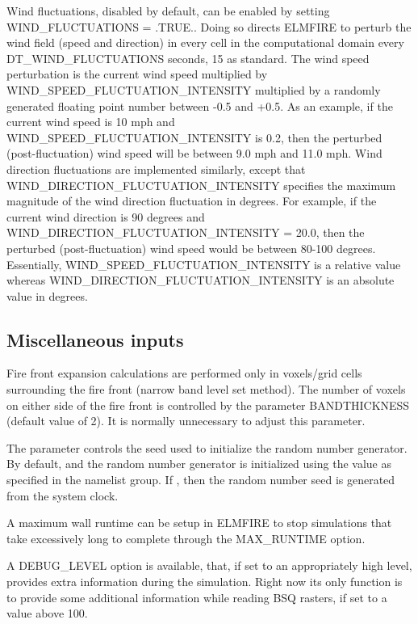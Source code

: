 Wind fluctuations, disabled by default, can be enabled by setting WIND\_FLUCTUATIONS = .TRUE.. Doing so directs ELMFIRE to perturb the wind field (speed and direction) in every cell in the computational domain every DT\_WIND\_FLUCTUATIONS seconds, 15 as standard. The wind speed perturbation is the current wind speed multiplied by WIND\_SPEED\_FLUCTUATION\_INTENSITY multiplied by a randomly generated floating point number between -0.5 and +0.5. As an example, if the current wind speed is 10 mph and WIND\_SPEED\_FLUCTUATION\_INTENSITY is 0.2, then the perturbed (post-fluctuation) wind speed will be between 9.0 mph and 11.0 mph. Wind direction fluctuations are implemented similarly, except that WIND\_DIRECTION\_FLUCTUATION\_INTENSITY specifies the maximum magnitude of the wind direction fluctuation in degrees. For example, if the current wind direction is 90 degrees and WIND\_DIRECTION\_FLUCTUATION\_INTENSITY = 20.0, then the perturbed (post-fluctuation) wind speed would be between 80-100 degrees. Essentially, WIND\_SPEED\_FLUCTUATION\_INTENSITY is a relative value whereas WIND\_DIRECTION\_FLUCTUATION\_INTENSITY is an absolute value in degrees.

\subsection{Miscellaneous inputs}
\label{miscellaneous_inputs}

Fire front expansion calculations are performed only in voxels/grid cells surrounding the fire front (narrow band level set method). The number of voxels on either side of the fire front is controlled by the parameter BANDTHICKNESS (default value of 2). It is normally unnecessary to adjust this parameter.

The parameter  controls the seed used to initialize the random number generator. By default,  and the random number generator is initialized using the  value as specified in the  namelist group. If , then the random number seed is generated from the system clock.

A maximum wall runtime can be setup in ELMFIRE to stop simulations that take excessively long to complete through the MAX\_RUNTIME option. 

A DEBUG\_LEVEL option is available, that, if set to an appropriately high level, provides extra information during the simulation. Right now its only function is to provide some additional information while reading BSQ rasters, if set to a value above 100. 

